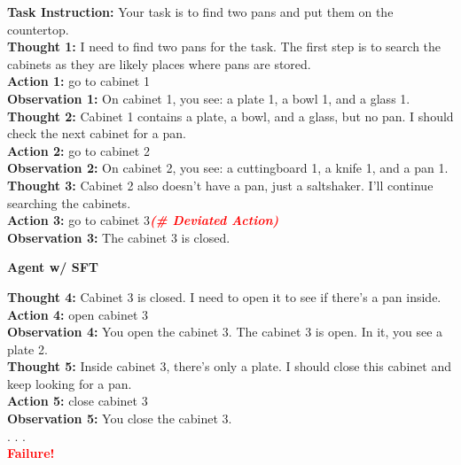 \begin{tcolorbox}[breakable,title=Case Study on the ALFWorld Benchmark]
\columnseprule=0.5pt
\begin{multicols}{2}

\textcolor{case_purple}{\textbf{Task Instruction:}} Your task is to find two pans and put them on the countertop.\\
\textcolor{case_blue}{\textbf{Thought 1:}} I need to find two pans for the task. The first step is to search the cabinets as they are likely places where pans are stored.\\
\textcolor{case_blue}{\textbf{Action 1:}} go to cabinet 1\\
\textcolor{case_purple}{\textbf{Observation 1:}} On cabinet 1, you see: a plate 1, a bowl 1, and a glass 1.\\
\textcolor{case_blue}{\textbf{Thought 2:}} Cabinet 1 contains a plate, a bowl, and a glass, but no pan. I should check the next cabinet for a pan.\\
\textcolor{case_blue}{\textbf{Action 2:}} go to cabinet 2\\
\textcolor{case_purple}{\textbf{Observation 2:}} On cabinet 2, you see: a cuttingboard 1, a knife 1, and a pan 1.\\
\textcolor{case_blue}{\textbf{Thought 3:}} Cabinet 2 also doesn't have a pan, just a saltshaker. I'll continue searching the cabinets.\\
\textcolor{case_blue}{\textbf{Action 3:}} go to cabinet 3\quad \textcolor{red}{\textit{\textbf{(\# Deviated Action)}}}\\
\textcolor{case_purple}{\textbf{Observation 3:}} The cabinet 3 is closed.\\

\begin{center}\textbf{Agent w/ SFT}\end{center}
\textcolor{case_blue}{\textbf{Thought 4:}} Cabinet 3 is closed. I need to open it to see if there's a pan inside.\\
\textcolor{case_blue}{\textbf{Action 4:}} open cabinet 3\\
\textcolor{case_purple}{\textbf{Observation 4:}} You open the cabinet 3. The cabinet 3 is open. In it, you see a plate 2.\\
\textcolor{case_blue}{\textbf{Thought 5:}} Inside cabinet 3, there's only a plate. I should close this cabinet and keep looking for a pan.\\
\textcolor{case_blue}{\textbf{Action 5:}} close cabinet 3\\
\textcolor{case_purple}{\textbf{Observation 5:}} You close the cabinet 3.\\
. . .\\
\textcolor{red}{\textbf{Failure!}}


\end{multicols}
\end{tcolorbox}
